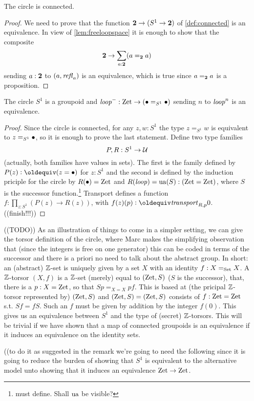 \begin{definition}
\begin{lemma}\label{lem:circleisconnected}
  The circle is connected.
\end{lemma}
\begin{proof}
  We need to prove that the function $\mathbf{2} \to(S^1\to\mathbf{2} )$ of \cref{def:connected} is an equivalence.  In view of \cref{lem:freeloopspace} it is enough to show that the composite
$$\mathbf{2} \to \sum_{a:\mathbf{2} }(a=_{\mathbf{2} }a)$$
sending $a:\mathbf{2} $ to $(a,\mathop{{\it refl}_{a}})$ is an equivalence, which is true since $a=_{\mathbf{2} }a$ is a proposition.
\end{proof}


\begin{lemma}\label{lem:S1groupoid}
  The circle $S^1$ is a groupoid and $\mathit{loop}^-:\mathrm{Zet}\to(\bullet=_{S^1}\bullet)$ sending $n$ to $\mathit{loop}^n$ is an equivalence.
\end{lemma}
\begin{proof}
  Since the circle is connected, for any $z,w:S^1$ the type $z=_{S^1}w$ is equivalent to $z=_{S^1}\bullet$, so it is enough to prove the last statement.  Define two type families 
$$P,R:S^1\to\mathcal{U}$$ (actually, both families have values in sets).  The first is the family defined by $P(z)\defequi(z=\base)$ for $z:S^1$ and the second is defined by the induction priciple for the circle by  %
$R(\bullet)=\mathrm{Zet}$ and $R(\mathit{loop})=\mathrm{ua}(S):(\mathrm{Zet}=\mathrm{Zet})$, where $S$ is the successor function.\footnote{must define.  Shall $\mathrm{ua}$ be visible?}%
Transport defines a function $f:\prod_{z:S^1}(P(z)\to R(z))$, with $f(z)(p)\defequi\trp_{R,p}0$.
((finish!!!))
\end{proof}
\begin{definition}
  \label{def:image}
\end{definition}
\begin{remark}
  ((TODO))
As an illustration of things to come in a simpler setting, we can give the torsor definition of the circle, where Marc makes the simplifying observation that (since the integers is free on one generator) this can be coded in terms of the successor and there is a priori no need to talk about the abstract group.  In short: an (abstract) $\mathbb{Z}$-set is uniquely given by a set $X$ with an identity $f: X=_{\mathord{\mathrm{Set}}}X$.  A $\mathbb{Z}$-torsor $(X,f)$ is a $\mathbb{Z}$-set (merely) equal to $(\mathrm{Zet},S)$ ($S$ is the successor), that, there is a $p:X=\mathrm{Zet}$, so that $Sp=_{X=X} pf$.  This is based at (the pricipal $\mathbb{Z}$-torsor represented by) $(\mathrm{Zet},S)$ and $(\mathrm{Zet},S)=(\mathrm{Zet},S)$ consists of $f:\mathrm{Zet}=\mathrm{Zet}$ s.t. $Sf=fS$.  Such an $f$ must be given by addition by the integer $f(0)$.  This gives us an equivalence between $S^1$ and the type of (secret) $\mathbb{Z}$-torsors.  This will be trivial if we have shown that a map of connected groupoids is an equivalence if it induces an equivalence on the identity sets.
\end{remark}
((to do it as suggested in the remark we're going to need the following since it is going to reduce the burden of showing that $S^1$ is equivalent to the alternative model unto showing that it induces an equivalence $\mathrm{Zet}\to\mathrm{Zet}$.  


\end{definition}
